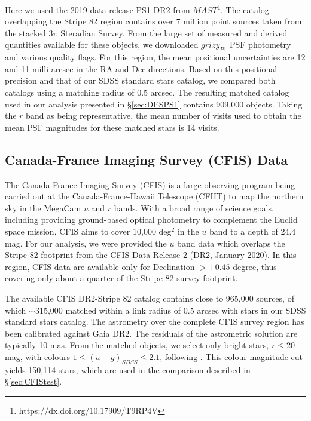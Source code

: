 \documentclass[fleqn,usenatbib]{mnras}
\begin{document}
 
Here we used the 2019 data release PS1-DR2 from $MAST$\footnote{https://dx.doi.org/10.17909/T9RP4V}. The catalog overlapping the Stripe 82 region contains over 7 million point sources taken from the stacked 3$\pi$ Steradian Survey. From the large set of measured and derived quantities available for these objects, we downloaded $grizy_{P1}$ PSF photometry and various quality flags. For this region, the mean positional uncertainties are 12 and 11 milli-arcsec in the RA and Dec directions. Based on this positional precision and that of our SDSS standard stars catalog, we compared both catalogs using a matching 
radius of 0.5 arcsec. The resulting matched catalog used in our analysis presented in \S \ref{sec:DESPS1} contains 
909,000 objects. Taking the $r$ band as being representative, the mean number of visits used to obtain the mean 
PSF magnitudes for these matched stars is 14 visits. 


\subsection{Canada-France Imaging Survey (CFIS) Data} \label{ssec:cfis}

The Canada-France Imaging Survey (CFIS) \citep{2017ApJ...848..128I} is a large observing program being carried out at the Canada-France-Hawaii Telescope (CFHT) to map the northern sky in the MegaCam $u$ and $r$ bands. With a broad range of science goals, including providing ground-based optical photometry to complement the Euclid space mission, CFIS aims to cover 10,000 deg$^2$ in the $u$ band to a depth of 24.4 mag. For our analysis, we were provided the $u$ band data which 
overlaps the Stripe 82 footprint from the CFIS Data Release 2 (DR2, January 2020). In this region, CFIS data are available
only for Declination $>+0.45$ degree, thus covering only about a quarter of the Stripe 82 survey footprint. 

The available CFIS DR2-Stripe 82 catalog contains close to 965,000 sources, of which $\sim$315,000 matched within 
a link radius of 0.5 arcsec with stars in our SDSS standard stars catalog. The astrometry over the complete CFIS survey 
region has been calibrated against Gaia DR2.  The residuals of the astrometric solution are typically 10 mas.  From the matched objects, we select only bright stars, $r \leq 20$ mag,  with colours  $ 1 \leq (u-g)_{SDSS} \leq 2.1$, following \cite{2017ApJ...848..128I}. This colour-magnitude cut yields 150,114 stars, which are used in the comparison described in \S \ref{sec:CFIStest}. 
\end{document}
